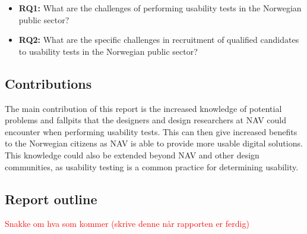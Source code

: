 \begin{itemize}
    \item \textbf{RQ1:} What are the challenges of performing usability tests in the Norwegian public sector?
    \item \textbf{RQ2:} What are the specific challenges in recruitment of qualified candidates to usability tests in the Norwegian public sector?
\end{itemize}

\subsection{Contributions}
The main contribution of this report is the increased knowledge of potential problems and fallpits that the designers and design researchers at NAV could encounter when performing usability tests. This can then give increased benefits to the Norwegian citizens as NAV is able to provide more usable digital solutions. This knowledge could also be extended beyond NAV and other design communities, as usability testing is a common practice for determining usability.

\subsection{Report outline}

\textcolor{red}{Snakke om hva som kommer (skrive denne når rapporten er ferdig) }